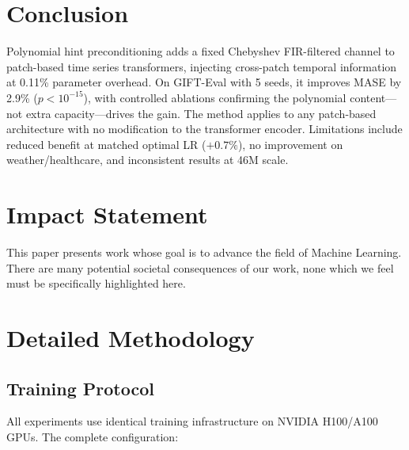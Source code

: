 \documentclass{article}
\begin{document}
\section{Conclusion}

Polynomial hint preconditioning adds a fixed Chebyshev FIR-filtered channel to patch-based time series transformers, injecting cross-patch temporal information at 0.11\% parameter overhead. On GIFT-Eval with 5 seeds, it improves MASE by 2.9\% ($p < 10^{-15}$), with controlled ablations confirming the polynomial content---not extra capacity---drives the gain. The method applies to any patch-based architecture \citep{woo2024unified,nie2023patchtst,das2024decoder} with no modification to the transformer encoder. Limitations include reduced benefit at matched optimal LR ($+0.7\%$), no improvement on weather/healthcare, and inconsistent results at 46M scale.

\section*{Impact Statement}

This paper presents work whose goal is to advance the field of Machine Learning. There are many potential societal consequences of our work, none which we feel must be specifically highlighted here.




\newpage
\appendix
\onecolumn

\section{Detailed Methodology}
\label{app:methodology}

\subsection{Training Protocol}

All experiments use identical training infrastructure on NVIDIA H100/A100 GPUs. The complete configuration:
\end{document}
